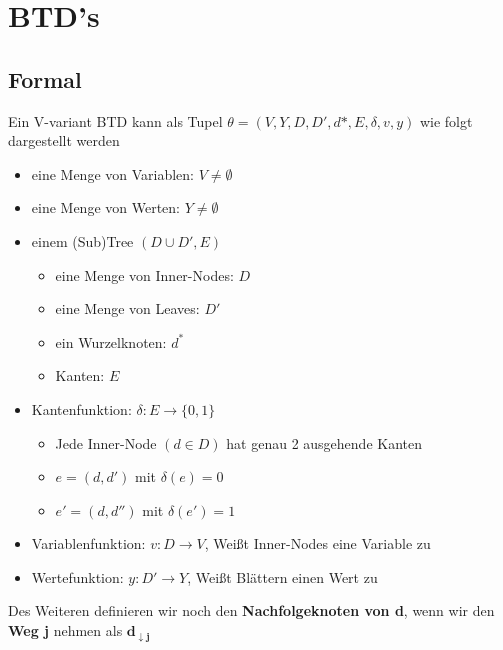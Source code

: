 \documentclass[12pt,a4paper]{article}
\begin{document}
\section{BTD's}
\subsection{Formal}
Ein V-variant BTD kann als Tupel $\theta = (V,Y,D,D',d*,E,\delta,v,y)$ wie folgt dargestellt werden
\begin{itemize}
\item eine Menge von Variablen: $V \neq \emptyset$
\item eine Menge von Werten: $Y \neq \emptyset$
\item einem (Sub)Tree $(D\cup D', E)$
\begin{itemize}
\item eine Menge von Inner-Nodes: $D$
\item eine Menge von Leaves: $D'$
\item ein Wurzelknoten: $d^*$
\item Kanten: $E$
\end{itemize}
\item Kantenfunktion: $\delta: E \rightarrow \{0,1\}$
\begin{itemize}
\item Jede Inner-Node $(d\in D)$ hat genau 2 ausgehende Kanten
\item $e=(d,d')$ mit $\delta(e) = 0$
\item $e'=(d,d'')$ mit $\delta(e') = 1$
\end{itemize}
\item Variablenfunktion: $v:D\rightarrow V$, Weißt Inner-Nodes eine Variable zu 
\item Wertefunktion: $y:D'\rightarrow Y$, Weißt Blättern einen Wert zu
\end{itemize}
Des Weiteren definieren wir noch den \textbf{Nachfolgeknoten von d}, wenn wir den \textbf{Weg j} nehmen als $\mathbf{d_{\downarrow j}}$
\end{document}
